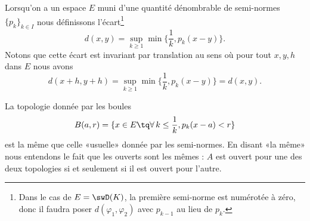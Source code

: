 Lorsqu'on a un espace \( E\) muni d'une quantité dénombrable de semi-normes \( \{ p_k \}_{k\in I}\) nous définissons l'écart\footnote{Dans le cas de \( E=\swD(K)\), la première semi-norme est numérotée à zéro, donc il faudra poser \( d(\varphi_1,\varphi_2)\) avec \( p_{k-1}\) au lieu de \( p_k\).}
\begin{equation}        \label{EqAAghiUR}
    d(x,y)=\sup_{k\geq 1}\min\big\{  \frac{1}{ k },p_k(x-y) \big\}.
\end{equation}
Notons que cette écart est invariant par translation au sens où pour tout \( x,y,h\) dans \( E\) nous avons
\begin{equation}
    d(x+h,y+h)=\sup_{k\geq 1}\min\big\{ \frac{1}{ k },p_k(x-y) \big\}=d(x,y).
\end{equation}

\begin{proposition} \label{PropLOwUvCO}
    La topologie donnée par les boules 
    \begin{equation}    \label{EqGHfYIlQ}
        B(a,r)=\{ x\in E\tq \forall\,k\leq \frac{1}{ k },p_k(x-a)<r\}
    \end{equation}
    est la même que celle «usuelle» donnée par les semi-normes. En disant «la même» nous entendons le fait que les ouverts sont les mêmes : \( A\) est ouvert pour une des deux topologies si et seulement si il est ouvert pour l'autre.
\end{proposition}

